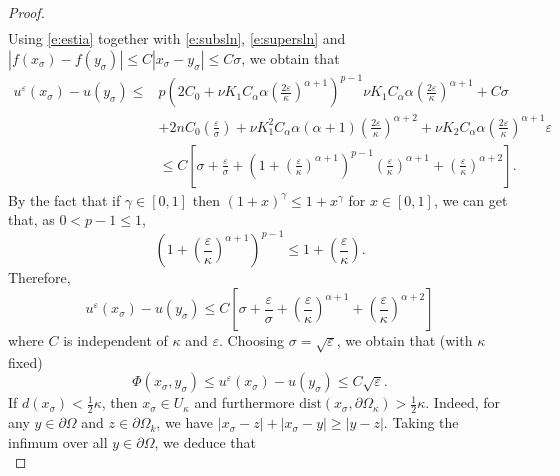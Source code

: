 \documentclass[12pt,reqno]{amsart}
\numberwithin{figure}{section}
\theoremstyle{plain}
\theoremstyle{remark}
\numberwithin{equation}{section}
\begin{document}
\begin{proof}
\begin{align}
\end{align}
Using \eqref{e:estia} together with \eqref{e:subsln}, \eqref{e:supersln} and $|f(x_\sigma) - f(y_\sigma)|\leq C|x_\sigma - y_\sigma|\leq C\sigma$, we obtain that
\begin{align*}
     u^\varepsilon(x_\sigma) - u(y_\sigma) \leq & p\left(2C_0+\nu K_1 C_\alpha \alpha\left( \frac{2\varepsilon}{\kappa}\right)^{\alpha+1}\right)^{p-1}\nu K_1 C_\alpha \alpha \left(\frac{2\varepsilon}{\kappa}\right)^{\alpha+1} + C\sigma\nonumber\\
    &+2nC_0\left(\frac{\varepsilon}{\sigma}\right) + \nu K_1^2C_\alpha \alpha(\alpha+1)\left(\frac{2\varepsilon}{\kappa}\right)^{\alpha+2} + \nu K_2 C_\alpha \alpha  \left(\frac{2\varepsilon}{\kappa}\right)^{\alpha+1}\varepsilon\nonumber\\
    &\leq C\left[\sigma + \frac{\varepsilon}{\sigma} + \left(1+\left(\frac{\varepsilon}{\kappa}\right)^{\alpha+1}\right)^{p-1}\left(\frac{\varepsilon}{\kappa}\right)^{\alpha+1} + \left(\frac{\varepsilon}{\kappa}\right)^{\alpha+2} \right].
\end{align*}
By the fact that if $\gamma\in [0,1]$ then $(1+x)^\gamma \leq 1+x^\gamma$ for $x\in [0,1]$, we can get that, as $0<p-1\leq 1$,
\begin{equation*}
    \left(1+\left(\frac{\varepsilon}{\kappa}\right)^{\alpha+1}\right)^{p-1} \leq 1+ \left(\frac{\varepsilon}{\kappa}\right).
\end{equation*}
Therefore,
\begin{equation*}
     u^\varepsilon(x_\sigma) - u(y_\sigma) \leq C\left[\sigma + \frac{\varepsilon}{\sigma} + \left(\frac{\varepsilon}{\kappa}\right)^{\alpha+1} + \left(\frac{\varepsilon}{\kappa}\right)^{\alpha+2}\right]
\end{equation*}
where $C$ is independent of $\kappa$ and $\varepsilon$. Choosing $\sigma = \sqrt{\varepsilon}$, we obtain that (with $\kappa$ fixed)
\begin{equation}\label{e:final1}
    \Phi(x_\sigma,y_\sigma) \leq u^\varepsilon(x_\sigma) - u(y_\sigma) \leq C\sqrt{\varepsilon}.
\end{equation}
If $d(x_\sigma) < \frac{1}{2}\kappa$, then $x_\sigma \in U_\kappa$ and furthermore $\mathrm{dist}(x_\sigma,\partial \Omega_\kappa) > \frac{1}{2}\kappa$. Indeed, for any $y\in\partial\Omega$ and $z\in \partial\Omega_k$, we have $|x_\sigma - z| + |x_\sigma - y| \geq |y-z|$. Taking the infimum over all $y\in \partial\Omega$, we deduce that
\begin{equation*}

\end{equation*}
\end{proof}
\end{document}

